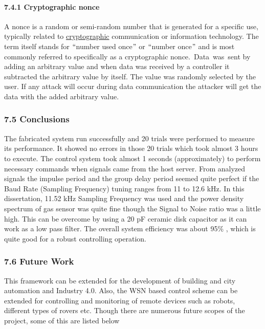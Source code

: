 \paragraph*{7.4.1 Cryptographic nonce}
\begin{justify}
A nonce is a random or semi-random number that is generated for a specific use, typically related to \href{https://searchsecurity.techtarget.com/definition/cryptography}{cryptographic} communication or information technology. The term itself stands for $``$number used once$"$  or $``$number once$"$  and is most commonly referred to specifically as a cryptographic nonce.\ Data\ was\ sent by adding an arbitrary value and when data was received by a controller it subtracted the arbitrary value by itself. The value was randomly selected by the user. If any attack will occur during data communication the attacker will get the data with the added arbitrary value.
\end{justify}\par

\subsubsection*{7.5 Conclusions}
\begin{justify}
The fabricated system run successfully and 20 trials were performed to measure its performance. It showed no errors in those 20 trials which took almost 3 hours to execute. The control system took almost 1 seconds (approximately) to perform necessary commands when signals came from the host server. From analyzed signals the impulse period and the group delay period seemed quite perfect if the Baud Rate (Sampling Frequency) tuning ranges from 11 to 12.6 kHz. In this dissertation, 11.52 kHz Sampling Frequency was used and the power density spectrum of gas sensor was quite fine though the Signal to Noise ratio was a little high. This can be overcome by using a 20 pF ceramic disk capacitor as it can work as a low pass filter. The overall system efficiency was about 95$\%$ , which is quite good for a robust controlling operation.
\end{justify}\par


\vspace{\baselineskip}
\subsubsection*{7.6 Future Work}
\begin{justify}
This framework can be extended for the development of building and city automation and Industry 4.0. Also, the WSN based control scheme can be extended for controlling and monitoring of remote devices such as robots, different types of rovers etc. Though there are numerous future scopes of the project, some of this are listed below
\end{justify}\par

